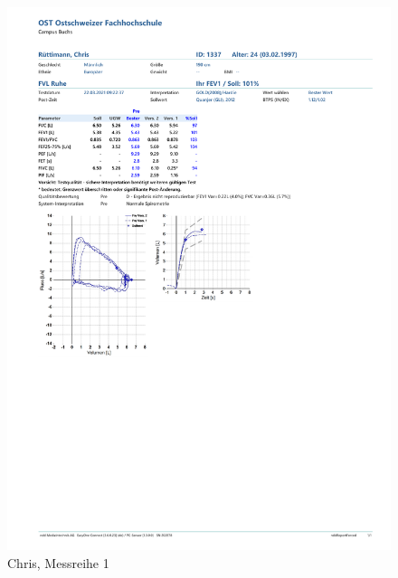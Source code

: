\documentclass[11pt]{scrartcl}
\begin{document}
    \begin{figure}[H]
        \centering
        \includegraphics[clip, trim=1cm 10cm 0cm 11cm, width=15cm]{Dateien/Chris1.pdf}
        \caption{Chris, Messreihe 1}
    \end{figure}
\end{document}
